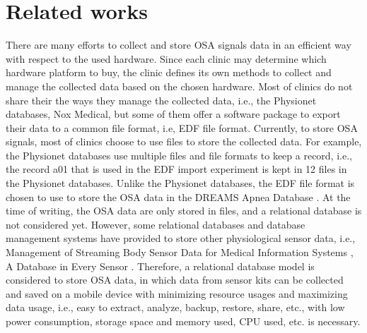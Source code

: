 \section{Related works}
There are many efforts to collect and store OSA signals data in an efficient way with respect to the used hardware. Since each clinic may determine which hardware platform to buy, the clinic defines its own methods to collect and manage the collected data based on the chosen hardware. Most of clinics do not share their the ways they manage the collected data, i.e., the Physionet databases, Nox Medical, but some of them offer a software package to export their data to a common file format, i.e, EDF file format. Currently, to store OSA signals, most of clinics choose to use files to store the collected data. For example, the Physionet databases use multiple files and file formats to keep a record, i.e., the record a01 that is used in the EDF import experiment is kept in 12 files in the Physionet databases. Unlike the Physionet databases, the EDF file format is chosen to use to store the OSA data in the DREAMS Apnea Database \citep{tcts}. At the time of writing, the OSA data are only stored in files, and a relational database is not considered yet. However, some relational databases and database management systems have provided to store other physiological sensor data, i.e., Management of Streaming Body Sensor Data for Medical Information Systems \citep{Alfonso}, A Database in Every Sensor \citep{Nicolas}. Therefore, a relational database model is considered to store OSA data, in which data from sensor kits can be collected and saved on a mobile device with minimizing resource usages and maximizing data usage, i.e., easy to extract, analyze, backup, restore, share, etc., with low power consumption, storage space and memory used, CPU used, etc. is necessary.

